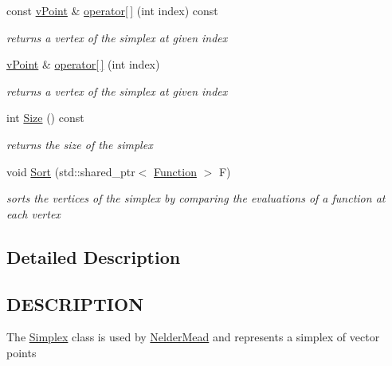 \begin{DoxyCompactItemize}
\mbox{\label{class_simplex_acf5182ffe99d4420d73ac6677175587a}} 
const \hyperlink{classv_point}{v\+Point} \& \hyperlink{class_simplex_acf5182ffe99d4420d73ac6677175587a}{operator\mbox{[}$\,$\mbox{]}} (int index) const
\begin{DoxyCompactList}\small\item\em returns a vertex of the simplex at given index \end{DoxyCompactList}\item 
\mbox{\label{class_simplex_a1da07de5cbb1433ea77ac92d6f68bfe7}} 
\hyperlink{classv_point}{v\+Point} \& \hyperlink{class_simplex_a1da07de5cbb1433ea77ac92d6f68bfe7}{operator\mbox{[}$\,$\mbox{]}} (int index)
\begin{DoxyCompactList}\small\item\em returns a vertex of the simplex at given index \end{DoxyCompactList}\item 
\mbox{\label{class_simplex_a0c567acb24ab41c2bfde8c33ed6c4a11}} 
int \hyperlink{class_simplex_a0c567acb24ab41c2bfde8c33ed6c4a11}{Size} () const
\begin{DoxyCompactList}\small\item\em returns the size of the simplex \end{DoxyCompactList}\item 
\mbox{\label{class_simplex_a78acd46dc28c213c8b16f2bce71d8e5a}} 
void \hyperlink{class_simplex_a78acd46dc28c213c8b16f2bce71d8e5a}{Sort} (std\+::shared\+\_\+ptr$<$ \hyperlink{class_function}{Function} $>$ F)
\begin{DoxyCompactList}\small\item\em sorts the vertices of the simplex by comparing the evaluations of a function at each vertex \end{DoxyCompactList}\end{DoxyCompactItemize}


\subsection{Detailed Description}
\hypertarget{function_8h_DESCRIPTION}{}\subsection{D\+E\+S\+C\+R\+I\+P\+T\+I\+ON}\label{function_8h_DESCRIPTION}
The \hyperlink{class_simplex}{Simplex} class is used by \hyperlink{class_nelder_mead}{Nelder\+Mead} and represents a simplex of vector points 

